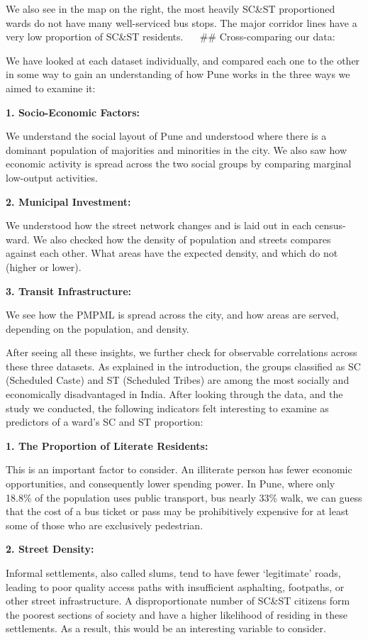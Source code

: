 \documentclass[
]{article}
\begin{document}
We also see in the map on the right, the most heavily SC\&ST
proportioned wards do not have many well-serviced bus stops. The major
corridor lines have a very low proportion of SC\&ST residents.   \#\#
Cross-comparing our data:

We have looked at each dataset individually, and compared each one to
the other in some way to gain an understanding of how Pune works in the
three ways we aimed to examine it:

\textbf{1. Socio-Economic Factors:}

We understand the social layout of Pune and understood where there is a
dominant population of majorities and minorities in the city. We also
saw how economic activity is spread across the two social groups by
comparing marginal low-output activities.

\textbf{2. Municipal Investment:}

We understood how the street network changes and is laid out in each
census-ward. We also checked how the density of population and streets
compares against each other. What areas have the expected density, and
which do not (higher or lower).

\textbf{3. Transit Infrastructure:}

We see how the PMPML is spread across the city, and how areas are
served, depending on the population, and density.

After seeing all these insights, we further check for observable
correlations across these three datasets. As explained in the
introduction, the groups classified as SC (Scheduled Caste) and ST
(Scheduled Tribes) are among the most socially and economically
disadvantaged in India. After looking through the data, and the study we
conducted, the following indicators felt interesting to examine as
predictors of a ward's SC and ST proportion:

\textbf{1. The Proportion of Literate Residents:}

This is an important factor to consider. An illiterate person has fewer
economic opportunities, and consequently lower spending power. In Pune,
where only 18.8\% of the population uses public transport, bus nearly
33\% walk, we can guess that the cost of a bus ticket or pass may be
prohibitively expensive for at least some of those who are exclusively
pedestrian.

\textbf{2. Street Density:}

Informal settlements, also called slums, tend to have fewer `legitimate'
roads, leading to poor quality access paths with insufficient
asphalting, footpaths, or other street infrastructure. A
disproportionate number of SC\&ST citizens form the poorest sections of
society and have a higher likelihood of residing in these settlements.
As a result, this would be an interesting variable to consider.
\end{document}
